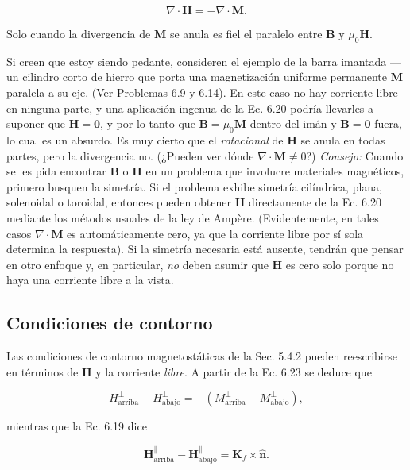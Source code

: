 \documentclass[12pt,a4paper]{report}
\begin{document}
	\begin{equation}
		\nabla \cdot \mathbf{H} = -\nabla \cdot \mathbf{M}. \tag{6.23}
	\end{equation}
	
	Solo cuando la divergencia de $\mathbf{M}$ se anula es fiel el paralelo entre $\mathbf{B}$ y $\mu_0\mathbf{H}$.
	
	Si creen que estoy siendo pedante, consideren el ejemplo de la barra imantada —un cilindro corto de hierro que porta una magnetización uniforme permanente $\mathbf{M}$ paralela a su eje. (Ver Problemas 6.9 y 6.14). En este caso no hay corriente libre en ninguna parte, y una aplicación ingenua de la Ec. 6.20 podría llevarles a suponer que $\mathbf{H} = \mathbf{0}$, y por lo tanto que $\mathbf{B} = \mu_0\mathbf{M}$ dentro del imán y $\mathbf{B} = \mathbf{0}$ fuera, lo cual es un absurdo. Es muy cierto que el \textit{rotacional} de $\mathbf{H}$ se anula en todas partes, pero la divergencia no. (¿Pueden ver dónde $\nabla \cdot \mathbf{M} \neq 0$?) \textit{Consejo:} Cuando se les pida encontrar $\mathbf{B}$ o $\mathbf{H}$ en un problema que involucre materiales magnéticos, primero busquen la simetría. Si el problema exhibe simetría cilíndrica, plana, solenoidal o toroidal, entonces pueden obtener $\mathbf{H}$ directamente de la Ec. 6.20 mediante los métodos usuales de la ley de Ampère. (Evidentemente, en tales casos $\nabla \cdot \mathbf{M}$ es automáticamente cero, ya que la corriente libre por sí sola determina la respuesta). Si la simetría necesaria está ausente, tendrán que pensar en otro enfoque y, en particular, \textit{no} deben asumir que $\mathbf{H}$ es cero solo porque no haya una corriente libre a la vista.
	
	\subsection{Condiciones de contorno}
	
	Las condiciones de contorno magnetostáticas de la Sec. 5.4.2 pueden reescribirse en términos de $\mathbf{H}$ y la corriente \textit{libre}. A partir de la Ec. 6.23 se deduce que
	
	\begin{equation}
		H_{\text{arriba}}^{\perp} - H_{\text{abajo}}^{\perp} = -(M_{\text{arriba}}^{\perp} - M_{\text{abajo}}^{\perp}), \tag{6.24}
	\end{equation}
	
	\noindent mientras que la Ec. 6.19 dice
	
	\begin{equation}
		\mathbf{H}_{\text{arriba}}^{\parallel} - \mathbf{H}_{\text{abajo}}^{\parallel} = \mathbf{K}_f \times \hat{\mathbf{n}}. \tag{6.25}
	\end{equation}
	
\end{document}
